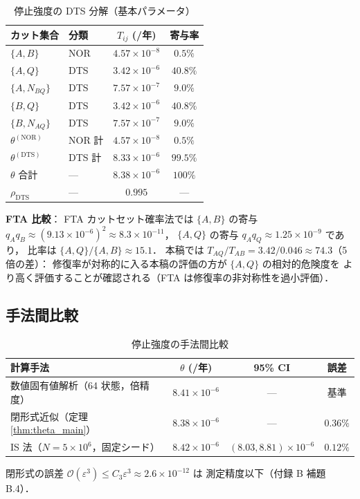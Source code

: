 \documentclass[12pt,a4paper]{article}
\theoremstyle{plain}
\theoremstyle{definition}
\theoremstyle{remark}
\newcommand{\calO}{\mathcal{O}}
\newcommand{\eps}{\varepsilon}
\newcommand{\thetaNOR}{\theta^{(\mathrm{NOR})}}
\newcommand{\thetaDTS}{\theta^{(\mathrm{DTS})}}
\newcommand{\rhoDTS}{\rho_{\mathrm{DTS}}}
\begin{document}
\begin{table}[H]
  \centering
  \caption{停止強度の DTS 分解（基本パラメータ）}
  \label{tab:DTS_decomp}
  \begin{tabular}{llcc}
    \toprule
    カット集合 & 分類 & $T_{ij}$ (/年) & 寄与率 \\
    \midrule
    $\{A,B\}$       & NOR & $4.57\times10^{-8}$ & $0.5\%$ \\
    $\{A,Q\}$       & DTS & $3.42\times10^{-6}$ & $40.8\%$ \\
    $\{A,N_{BQ}\}$  & DTS & $7.57\times10^{-7}$ & $9.0\%$ \\
    $\{B,Q\}$       & DTS & $3.42\times10^{-6}$ & $40.8\%$ \\
    $\{B,N_{AQ}\}$  & DTS & $7.57\times10^{-7}$ & $9.0\%$ \\
    \midrule
    $\thetaNOR$      & NOR 計  & $4.57\times10^{-8}$ & $0.5\%$ \\
    $\thetaDTS$      & DTS 計  & $8.33\times10^{-6}$ & $99.5\%$ \\
    $\theta$ 合計   & ---     & $8.38\times10^{-6}$ & $100\%$ \\
    \midrule
    $\rhoDTS$ & --- & $0.995$ & --- \\
    \bottomrule
  \end{tabular}
\end{table}

\textbf{FTA 比較}：
FTA カットセット確率法では
$\{A,B\}$ の寄与 $q_Aq_B\approx(9.13\times10^{-6})^2\approx8.3\times10^{-11}$，
$\{A,Q\}$ の寄与 $q_Aq_Q\approx1.25\times10^{-9}$ であり，
比率は $\{A,Q\}/\{A,B\}\approx15.1$．
本稿では $T_{AQ}/T_{AB}=3.42/0.046\approx74.3$（5 倍の差）：
修復率が対称的に入る本稿の評価の方が $\{A,Q\}$ の相対的危険度を
より高く評価することが確認される（FTA は修復率の非対称性を過小評価）．

\subsection{手法間比較}

\begin{table}[H]
  \centering
  \caption{停止強度の手法間比較}
  \label{tab:compare}
  \small
  \begin{tabular}{p{5.5cm}ccc}
    \toprule
    計算手法 & $\theta$ (/年) & 95\% CI & 誤差 \\
    \midrule
    数値固有値解析（64 状態，倍精度） & $8.41\times10^{-6}$ & --- & 基準 \\
    閉形式近似（定理 \ref{thm:theta_main}） & $8.38\times10^{-6}$ & --- & $0.36\%$ \\
    IS 法（$N=5\times10^6$，固定シード） & $8.42\times10^{-6}$
      & $(8.03,8.81)\times10^{-6}$ & $0.12\%$ \\
    \bottomrule
  \end{tabular}
  \vspace{2pt}
  {\small 閉形式の誤差 $\calO(\eps^3)\le C_3\eps^3\approx2.6\times10^{-12}$ は
  測定精度以下（付録 B 補題 B.4）．}
\end{table}
\end{document}
